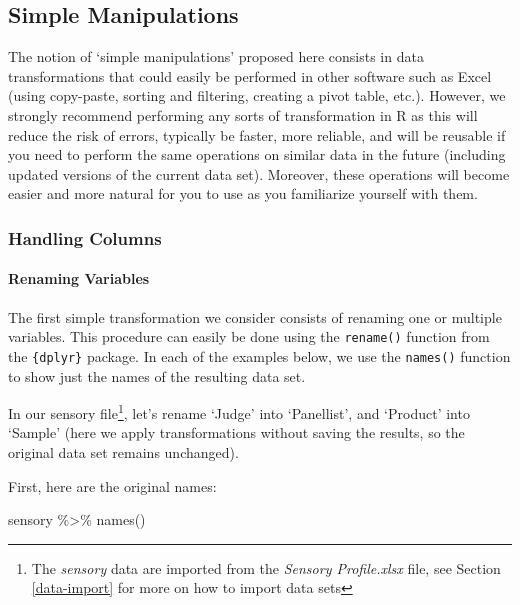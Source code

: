 \documentclass[
]{book}
\newenvironment{Shaded}{\begin{snugshade}}{\end{snugshade}}
\newcommand{\FunctionTok}[1]{\textcolor[rgb]{0.00,0.00,0.00}{#1}}
\newcommand{\NormalTok}[1]{#1}
\newcommand{\SpecialCharTok}[1]{\textcolor[rgb]{0.00,0.00,0.00}{#1}}
\begin{document}
\hypertarget{simple-manipulations}{%
\subsection{Simple Manipulations}\label{simple-manipulations}}

The notion of `simple manipulations' proposed here consists in data transformations that could easily be performed in other software such as Excel (using copy-paste, sorting and filtering, creating a pivot table, etc.). However, we strongly recommend performing any sorts of transformation in R as this will reduce the risk of errors, typically be faster, more reliable, and will be reusable if you need to perform the same operations on similar data in the future (including updated versions of the current data set). Moreover, these operations will become easier and more natural for you to use as you familiarize yourself with them.

\hypertarget{handling-columns}{%
\subsubsection{Handling Columns}\label{handling-columns}}

\hypertarget{renaming-variables}{%
\paragraph{Renaming Variables}\label{renaming-variables}}

The first simple transformation we consider consists of renaming one or multiple variables. This procedure can easily be done using the \texttt{rename()} function from the \texttt{\{dplyr\}} package. In each of the examples below, we use the \texttt{names()} function to show just the names of the resulting data set.

In our sensory file\footnote{The \emph{sensory} data are imported from the \emph{Sensory Profile.xlsx} file, see Section \ref{data-import} for more on how to import data sets}, let's rename `Judge' into `Panellist', and `Product' into `Sample' (here we apply transformations without saving the results, so the original data set remains unchanged).

First, here are the original names:

\begin{Shaded}
\begin{Highlighting}[]
\NormalTok{sensory }\SpecialCharTok{\%\textgreater{}\%} 
  \FunctionTok{names}\NormalTok{()}
\end{Highlighting}
\end{Shaded}
\end{document}
